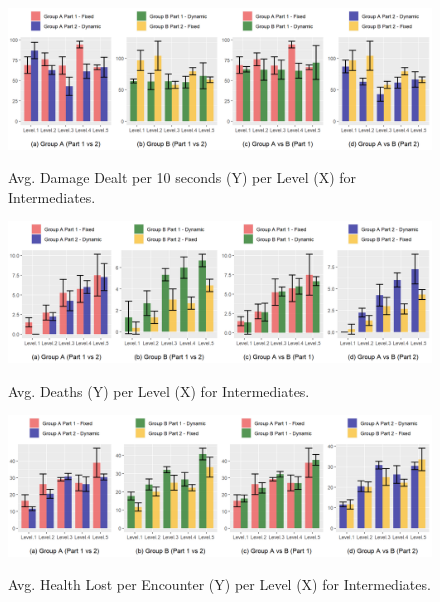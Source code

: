 \begin{figure}[!ht]
    \begin{center}
    \caption{Avg. Damage Dealt per 10 seconds (Y) per Level (X) for Intermediates.}
        \includegraphics[width=34em]{figures/damage_dealt_per_10s-intermediate_players.png}
        \label{fig:result-metric-intermediates-damage-dealt-per-10s}
    \end{center}
\end{figure}

\begin{figure}[!ht]
    \begin{center}
    \caption{Avg. Deaths (Y) per Level (X) for Intermediates.}
        \includegraphics[width=34em]{figures/deaths_per_level-intermediate_players.png}
        \label{fig:result-metric-intermediates-deaths-per-level}
    \end{center}
\end{figure}

\begin{figure}[!ht]
    \begin{center}
    \caption{Avg. Health Lost per Encounter (Y) per Level (X) for Intermediates.}
        \includegraphics[width=34em]{figures/health_lost_per_encounter-intermediate_players.png}
        \label{fig:result-metric-intermediates-health-lost-per-encounter}
    \end{center}
\end{figure}

